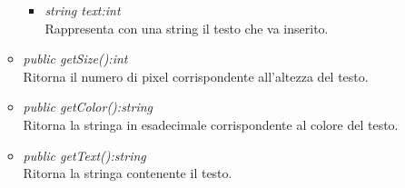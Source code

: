 \begin{itemize}
\begin{itemize}
{\begin{itemize}
		\item \textit{string text:int}\\
		Rappresenta con una string il testo che va inserito.
		\end{itemize}}
	\item \textit{public getSize():int}\\
	Ritorna il numero di pixel corrispondente all'altezza del testo.
	\item \textit{public getColor():string}\\
	Ritorna  la stringa in esadecimale corrispondente al colore del testo.
	\item \textit{public getText():string}\\
	Ritorna la stringa contenente il testo.
	\end{itemize}
\end{itemize}

